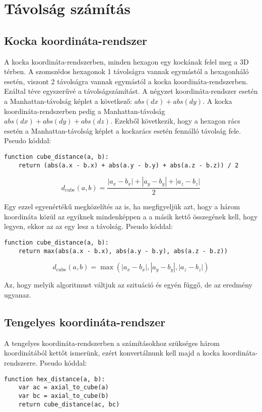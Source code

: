 \chapter{Távolság számítás}

\section{Kocka koordináta-rendszer}

A kocka koordináta-rendszerben, minden hexagon egy kockának felel meg a 3D térben. A szomszédos hexagonok 1 távolságra vannak egymástól a hexagonháló esetén, viszont 2 távolságra vannak egymástól a kocka koordináta-rendszerben. Ezáltal téve egyszerűvé a távolságszámítást. A négyzet koordináta-rendszer esetén a Manhattan-távolság képlet a következő: $abs(dx) + abs(dy)$. A kocka koordináta-rendszerben pedig a Manhattan-távolság $abs(dx) + abs(dy) + abs(dz)$. Ezekből következik, hogy a hexagon rács esetén a Manhattan-távolság képlet a kockarács esetén fennálló távolság fele.
\newline
\newline Pseudo kóddal:
\begin{verbatim}
function cube_distance(a, b):
    return (abs(a.x - b.x) + abs(a.y - b.y) + abs(a.z - b.z)) / 2
\end{verbatim}    

$$
d_{\text{cube}}(a, b) =
\dfrac{|a_x - b_x| + |a_y - b_y| + |a_z - b_z|}{2}
$$

\noindent Egy ezzel egyenértékű megközelítés az is, ha megfigyeljük azt, hogy a három koordináta közül az egyiknek mindenképpen a a másik kettő összegének kell, hogy legyen, ekkor az az egy lesz a távolság. 
\newline
\newline Pseudo kóddal:
\begin{verbatim}
function cube_distance(a, b):
    return max(abs(a.x - b.x), abs(a.y - b.y), abs(a.z - b.z))
\end{verbatim}

$$
d_{\text{cube}}(a, b) =
\max(
|a_x - b_x|, |a_y - b_y|, |a_z - b_z|
)
$$

\noindent Az, hogy melyik algoritmust váltjuk az szituáció és egyén függő, de az eredmény ugyanaz.

\section{Tengelyes koordináta-rendszer}

A tengelyes koordináta-rendszerben a számításokhoz szükséges három koordinátából kettőt ismerünk, ezért konvertálnunk kell majd a kocka koordináta-rendszerre.
\newline
\newline Pseudo kóddal:
\begin{verbatim}
function hex_distance(a, b):
    var ac = axial_to_cube(a)
    var bc = axial_to_cube(b)
    return cube_distance(ac, bc)
\end{verbatim}    

